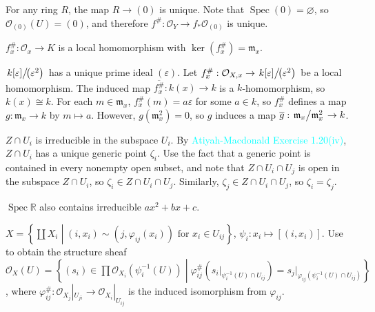 \begin{exercise}\label{ex2.6}
	For any ring $R$, the map $R\rightarrow(0)$ is unique. Note that $\operatorname{Spec}(0)=\varnothing$, so $\mathcal{O}_{(0)}(U)=(0)$, and therefore $f^\#:\mathcal{O}_Y\rightarrow f_*\mathcal{O}_{(0)}$ is unique.
\end{exercise}

\begin{exercise}\label{ex2.7}
	$f_x^\#:\mathcal{O}_x\rightarrow K$ is a local homomorphism with $\ker\!\left(f_x^\#\right)=\mathfrak{m}_x$.
\end{exercise}

\begin{exercise}\label{ex2.8}
	$\left.k[\varepsilon]\middle/\!\left(\varepsilon^2\right)\right.$ has a unique prime ideal $(\varepsilon)$. Let $f_x^\#:\mathcal{O}_{X,x}\rightarrow\left.k[\varepsilon]\middle/\!\left(\varepsilon^2\right)\right.$ be a local homomorphism. The induced map $\overline{f_x^\#}:k(x)\rightarrow k$ is a $k$-homomorphism, so $k(x)\cong k$. For each $m\in\mathfrak{m}_x$, $f_x^\#(m)=a\varepsilon$ for some $a\in k$, so $f_x^\#$ defines a map $g:\mathfrak{m}_x\rightarrow k$ by $m\mapsto a$. However, $g\!\left(\mathfrak{m}_x^2\right)=0$, so $g$ induces a map $\overline{g}:\left.\mathfrak{m}_x\middle/\mathfrak{m}_x^2\right.\rightarrow k$.
\end{exercise}

\begin{exercise}\label{ex2.9}
	$Z\cap U_i$ is irreducible in the subspace $U_i$. By \textcolor{cyan}{Atiyah-Macdonald Exercise 1.20(iv)}, $Z\cap U_i$ has a unique generic point $\zeta_i$. Use the fact that a generic point is contained in every nonempty open subset, and note that $Z\cap U_i\cap U_j$ is open in the subspace $Z\cap U_i$, so $\zeta_i\in Z\cap U_i\cap U_j$. Similarly, $\zeta_j\in Z\cap U_i\cap U_j$, so $\zeta_i=\zeta_j$.
\end{exercise}

\begin{exercise}\label{ex2.10}
	$\operatorname{Spec}\mathbb{R}$ also contains irreducible $ax^2+bx+c$.
\end{exercise}

\begin{exercise}\label{ex2.11}
	
\end{exercise}

\begin{exercise}\label{ex2.12}
	$X=\left\{\coprod X_i\middle|\left(i,x_i\right)\sim\left(j,\varphi_{ij}(x_i)\right)\text{ for }x_i\in U_{ij}\right\}$, $\psi_i:x_i\mapsto\left[\left(i,x_i\right)\right]$. Use  to obtain the structure sheaf $\mathcal{O}_X(U)=\left\{\left(s_i\right)\in\prod\mathcal{O}_{X_i}\!\left(\psi_i^{-1}(U)\right)\middle|\varphi_{ij}^\#\!\left(s_i|_{\psi_i^{-1}(U)\cap U_{ij}}\right)=s_j|_{\varphi_{ij}\left(\psi_i^{-1}(U)\cap U_{ij}\right)}\right\}$, where $\varphi_{ij}^\#:\mathcal{O}_{X_j}|_{U_{ji}}\rightarrow\mathcal{O}_{X_i}|_{U_{ij}}$ is the induced isomorphism from $\varphi_{ij}$.
\end{exercise}

